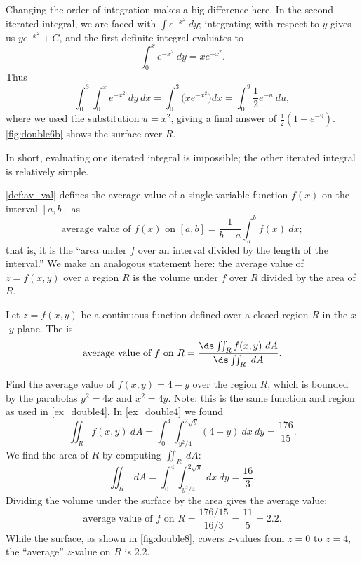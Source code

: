{Changing the order of integration makes a big difference here. In the second iterated integral, we are faced with $\int e^{-x^2}\ dy$; integrating with respect to $y$ gives us $ye^{-x^2}+C$, and the first definite integral evaluates to 
\[\int_0^x e^{-x^2}\ dy = xe^{-x^2}.\]
%
%
%
Thus 
\[
 \int_0^3\int_0^x e^{-x^2}\ dy\ dx
 = \int_0^3\Big(xe^{-x^2}\Big)dx
 = \int_0^9\frac12 e^{-u}\ du,
\]
where we used the substitution $u=x^2$, giving a final answer of $\frac12(1-e^{-9})%
$. \autoref{fig:double6b} shows the surface over $R$.

In short, evaluating one iterated integral is impossible; the other iterated integral is relatively simple.}

\autoref{def:av_val} defines the average value of a single-variable function $f(x)$ on the interval $[a,b]$ as
\[\text{average value of $f(x)$ on $[a,b]$} = \frac1{b-a}\int_a^b f(x)\ dx;\]
that is, it is the ``area under $f$ over an interval divided by the length of the interval.'' We make an analogous statement here: the average value of $z=f(x,y)$ over a region $R$ is the volume under $f$ over $R$ divided by the area of $R$.

\begin{definition}\label{def:av_val2}
Let $z=f(x,y)$ be a continuous function defined over a closed region $R$ in the $x$-$y$ plane. The  is 
\[\text{average value of $f$ on $R$} = \frac{\ds \iint_R f(x,y)\ dA}{\ds\iint_R \ dA}.\]
\end{definition}

{Find the average value of $f(x,y) = 4-y$ over the region $R$, which is bounded by the parabolas $y^2=4x$ and $x^2=4y$. Note: this is the same function and region as used in \autoref{ex_double4}.
}
{In \autoref{ex_double4} we found 
\[\iint_R f(x,y)\ dA = \int_0^4\int_{y^2/4}^{2\sqrt{y}}(4-y)\ dx\ dy = \frac{176}{15}.\] 
We find the area of $R$ by computing $\iint_R \ dA$:
\[\iint_R \ dA = \int_0^4\int_{y^2/4}^{2\sqrt{y}} \ dx\ dy = \frac{16}{3}.\]
%
%
%
Dividing the volume under the surface by the area gives the average value:
\[\text{average value of $f$ on $R$} = \frac{176/15}{16/3} = \frac{11}5 = 2.2.\]
While the surface, as shown in \autoref{fig:double8}, covers $z$-values from $z=0$ to $z=4$, the ``average'' $z$-value on $R$ is 2.2.}

